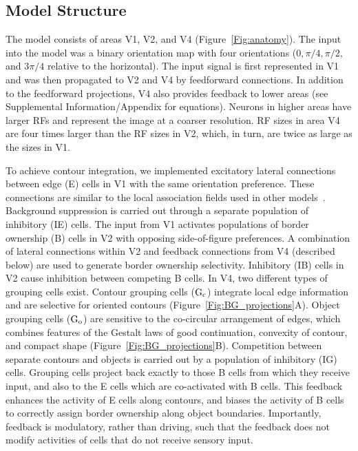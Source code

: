\subsection{Model Structure}

%
The model consists of areas V1, V2, and V4 (Figure~\ref{Fig:anatomy}). The input into the model was a binary orientation map with four orientations ($0, \pi/4, \pi/2,$ and  $3\pi/4$ relative to the horizontal). The input signal is first represented in V1 and was then propagated to V2 and V4 by feedforward connections. In addition to the feedforward projections, V4 also provides feedback to lower areas (see Supplemental Information/Appendix for equations). Neurons in higher areas have larger RFs and represent the image at a coarser resolution. RF sizes in area V4 are four times larger than the RF sizes in V2, which, in turn, are twice as large as the sizes in V1.

To achieve contour integration, we implemented excitatory lateral connections between edge (E) cells in V1 with the same orientation preference. These connections are similar to the local association fields used in other models~\citep{Li98,Piech_etal13}. Background suppression is carried out through a separate population of inhibitory (IE) cells. The input from V1 activates populations of border ownership (B) cells in V2 with opposing side-of-figure preferences. A combination of lateral connections within V2 and feedback connections from V4 (described below) are used to generate border ownership selectivity. Inhibitory (IB) cells in V2 cause inhibition between competing B cells. In V4, two different types of grouping cells exist. Contour grouping cells ($\rm G_c$) integrate local edge information and are selective for oriented contours (Figure~\ref{Fig:BG_projections}A). Object grouping cells ($\rm G_o$) are sensitive to the co-circular arrangement of edges, which combines features of the Gestalt laws of good continuation, convexity of contour, and compact shape (Figure~\ref{Fig:BG_projections}B). Competition between separate contours and objects is carried out by a population of inhibitory (IG) cells. Grouping cells project back exactly to those B cells from which they receive input, and also to the E cells which are co-activated with B cells. This feedback enhances the activity of E cells along contours, and biases the activity of B cells to correctly assign border ownership along object boundaries. Importantly, feedback is modulatory, rather than driving, such that the feedback does not modify activities of cells that do not receive sensory input.

